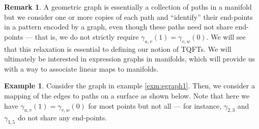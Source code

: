 \documentclass{amsart}
\numberwithin{thm}{section}
\theoremstyle{definition}
\newtheorem{rmk}[thm]{Remark}
\newtheorem{exm}[thm]{Example}
\begin{document}
\begin{rmk}
A geometric graph is essentially a collection of paths in a manifold but we
consider one or more copies of each path and ``identify'' their end-points in a
pattern encoded by a graph, even though these paths need not share end-points
--- that is, we do not strictly require $\gamma_{u, v}(1) = \gamma_{v, w}(0)$.
We will see that this relaxation is essential to defining our notion of TQFTs.
We will ultimately be interested in expression graphs in manifolds, which will
provide us with a way to associate linear maps to manifolds.
\end{rmk}

\begin{exm}\label{exm:geomegraph}
Consider the graph in example \ref{exm:egraph1}. Then, we consider a mapping of
the edges to paths on a surface as shown below. Note that here we have
$\gamma_{u, v}(1) = \gamma_{v, w}(0)$ for most points but not all --- for
instance, $\gamma_{2, 3}$ and $\gamma_{3, 5}$ do not share any end-points.
\begin{figure}[H]\label{fig:geomegraph}
\begin{center}
%
\begin{tikzpicture}[x=0.75pt,y=0.75pt,yscale=-0.95,xscale=0.95]


\end{tikzpicture}
\end{center}
\end{figure}
\end{exm}
\end{document}
